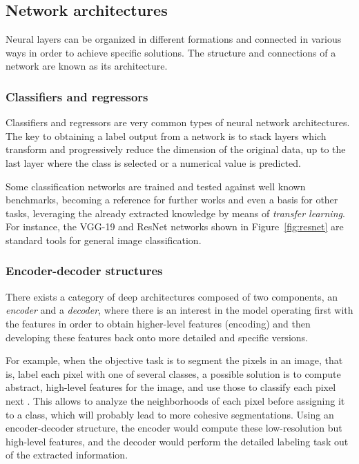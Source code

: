 \subsection{Network architectures}

Neural layers can be organized in different formations and connected in various ways in order to achieve specific solutions. The structure and connections of a network are known as its architecture.

\subsubsection{Classifiers and regressors}

Classifiers and regressors are very common types of neural network architectures. The key to obtaining a label output from a network is to stack layers which transform and progressively reduce the dimension of the original data, up to the last layer where the class is selected or a numerical value is predicted. 

Some classification networks are trained and tested against well known benchmarks, becoming a reference for further works and even a basis for other tasks, leveraging the already extracted knowledge by means of \textit{transfer learning}. For instance, the VGG-19 and ResNet networks shown in Figure~\ref{fig:resnet} are standard tools for general image classification.

\subsubsection{Encoder-decoder structures}

There exists a category of deep architectures composed of two components, an \textit{encoder} and a \textit{decoder}, where there is an interest in the model operating first with the features in order to obtain higher-level features (encoding) and then developing these features back onto more detailed and specific versions.

For example, when the objective task is to segment the pixels in an image, that is, label each pixel with one of several classes, a possible solution is to compute abstract, high-level features for the image, and use those to classify each pixel next . This allows to analyze the neighborhoods of each pixel before assigning it to a class, which will probably lead to more cohesive segmentations. Using an encoder-decoder structure, the encoder would compute these low-resolution but high-level features, and the decoder would perform the detailed labeling task out of the extracted information.

